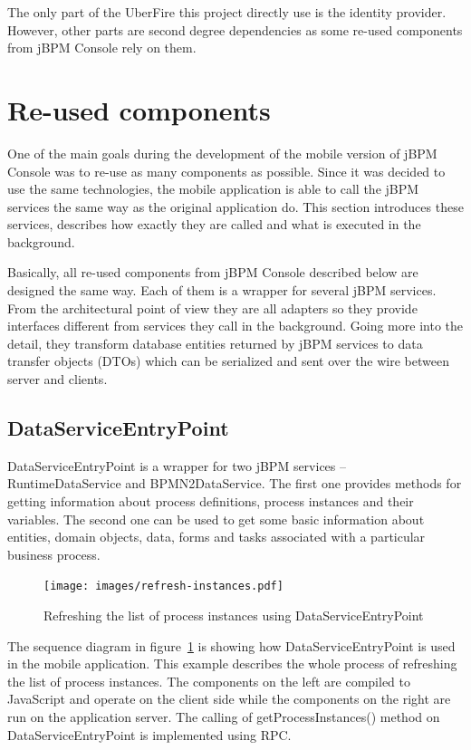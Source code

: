 \documentclass[12pt,oneside,final]{fithesis2}
\begin{document}
The only part of the UberFire this project directly use is the identity provider.
However, other parts are second degree dependencies as some re-used components from jBPM Console rely on them.

\section{Re-used components}
One of the main goals during the development of the mobile version of jBPM Console was to re-use as many components as possible.
Since it was decided to use the same technologies, the mobile application is able to call the jBPM services the same way as the original application do.
This section introduces these services, describes how exactly they are called and what is executed in the background.

Basically, all re-used components from jBPM Console described below are designed the same way.
Each of them is a wrapper for several jBPM services.
From the architectural point of view they are all adapters so they provide interfaces different from services they call in the background.
Going more into the detail, they transform database entities returned by jBPM services to data transfer objects (DTOs) which can be serialized and sent over the wire between server and clients.


\label{sec:reused-components}
\subsection{DataServiceEntryPoint}

DataServiceEntryPoint is a wrapper for two jBPM services -- RuntimeDataService and BPMN2DataService.
The first one provides methods for getting information about process definitions, process instances and their variables.
The second one can be used to get some basic information about entities, domain objects, data, forms and tasks associated with a particular business process.

\begin{figure}[ht!]
\centering
\texttt{[image: images/refresh-instances.pdf]}
\caption{Refreshing the list of process instances using DataServiceEntryPoint}
\label{fig:refresh-instances}
\end{figure}

The sequence diagram in figure~\ref{fig:refresh-instances} is showing how DataServiceEntryPoint is used in the mobile application.
This example describes the whole process of refreshing the list of process instances.
The components on the left are compiled to JavaScript and operate on the client side while the components on the right are run on the application server.
The calling of getProcessInstances() method on DataServiceEntryPoint is implemented using RPC.
\end{document}
